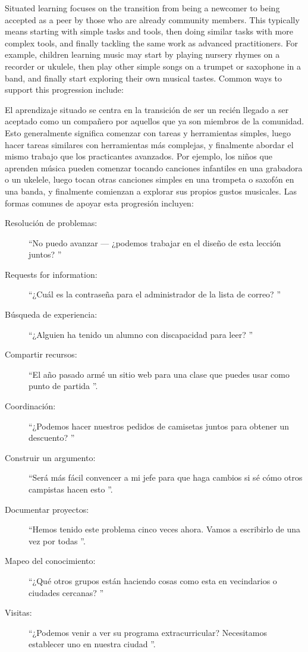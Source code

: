 Situated learning focuses on the transition from being a newcomer
to being accepted as a peer by those who are already community members.
This typically means starting with simple tasks and tools,
then doing similar tasks with more complex tools,
and finally tackling the same work as advanced practitioners.
For example,
children learning music may start by playing nursery rhymes on a recorder or ukulele,
then play other simple songs on a trumpet or saxophone in a band,
and finally start exploring their own musical tastes.
Common ways to support this progression include:

El aprendizaje situado se centra en la transición de ser un recién llegado
a ser aceptado como un compañero por aquellos que ya son miembros de la comunidad.
Esto generalmente significa comenzar con tareas y herramientas simples,
luego hacer tareas similares con herramientas más complejas,
y finalmente abordar el mismo trabajo que los practicantes avanzados.
Por ejemplo,
los niños que aprenden música pueden comenzar tocando canciones infantiles en una grabadora o un ukelele,
luego tocan otras canciones simples en una trompeta o saxofón en una banda,
y finalmente comienzan a explorar sus propios gustos musicales.
Las formas comunes de apoyar esta progresión incluyen:

\newpage
\begin{description}

\item[Resolución de problemas:]
  ``No puedo avanzar --- ¿podemos trabajar en el diseño de esta lección juntos? ''
\item[Requests for information:]
  ``¿Cuál es la contraseña para el administrador de la lista de correo? ''
\item[Búsqueda de experiencia:]
  ``¿Alguien ha tenido un alumno con discapacidad para leer? ''
\item[Compartir recursos:]
  ``El año pasado armé un sitio web para una clase que puedes usar como punto de partida ''.
\item[Coordinación:]
  ``¿Podemos hacer nuestros pedidos de camisetas juntos para obtener un descuento? ''
\item[Construir un argumento:]
  ``Será más fácil convencer a mi jefe para que haga cambios si sé cómo otros campistas hacen esto ''.
\item[Documentar proyectos:]
  ``Hemos tenido este problema cinco veces ahora. Vamos a escribirlo de una vez por todas ''.
\item[Mapeo del conocimiento:]
  ``¿Qué otros grupos están haciendo cosas como esta en vecindarios o ciudades cercanas? ''
\item[Visitas:]
  ``¿Podemos venir a ver su programa extracurricular? Necesitamos establecer uno en nuestra ciudad ''.
\end{description}

